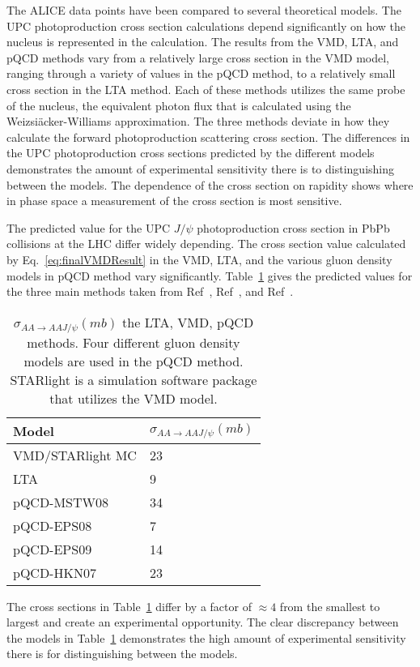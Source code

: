     The ALICE data points have been compared to several theoretical models. 
  The UPC photoproduction cross section calculations depend significantly on 
    how the nucleus is represented in the calculation. 
  The results from the VMD, LTA, and pQCD methods vary from a relatively 
    large cross section in the VMD model, ranging through a variety of values
    in the pQCD method, to a relatively small cross section in the LTA method. 
  Each of these methods utilizes the same probe of the nucleus, the equivalent 
    photon flux that is calculated using the Weizsi\"{a}cker-Williams approximation. 
  The three methods deviate in how they calculate the forward photoproduction
    scattering cross section.
  The differences in the UPC photoproduction cross sections predicted by the 
    different models demonstrates the amount of experimental sensitivity there 
    is to distinguishing between the models. 
  The dependence of the cross section on rapidity shows where in phase space 
    a measurement of the cross section is most sensitive.
   
  The predicted value for the UPC $J/\psi$ photoproduction cross section in 
    PbPb collisions at the LHC differ widely depending.
  The cross section value calculated by Eq.~\ref{eq:finalVMDResult} in the 
    VMD, LTA, and the various gluon density models in pQCD method vary 
    significantly.
  Table~\ref{tab:allXsec} gives the predicted values for the three main methods
    taken from Ref~\cite{pQCD2013.02}, Ref~\cite{lta2011.09}, and Ref~\cite{vmd1999}.
  \begin{table} 
   \centering
   \begin{tabular}{|l|l|} 
     \hline
     Model & $\sigma_{AA\rightarrow AAJ/\psi} (mb)$ \\ \hline \hline
     VMD/STARlight MC & 23 \\ \hline
     LTA & 9 \\ \hline
     pQCD-MSTW08 & 34 \\ \hline
     pQCD-EPS08 & 7  \\ \hline
     pQCD-EPS09 & 14 \\ \hline
     pQCD-HKN07 & 23 \\ \hline
     \hline
   \end{tabular}
   \caption{$\sigma_{AA\rightarrow AAJ/\psi} (mb)$
    the LTA, VMD, pQCD methods. Four different gluon density models are used 
    in the pQCD method. STARlight is a simulation software package that utilizes 
    the VMD model.}
   \label{tab:allXsec}
  \end{table}
  The cross sections in Table~\ref{tab:allXsec} differ by a factor of $\approx4$ 
    from the smallest to largest and create an experimental opportunity. 
  The clear discrepancy between the models in Table~\ref{tab:allXsec} 
    demonstrates the high amount of experimental sensitivity there is for 
    distinguishing between the models. 

